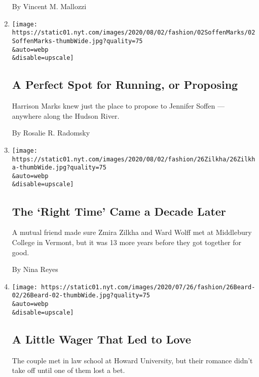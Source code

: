\begin{enumerate}
  By Vincent M. Mallozzi
\item
  \href{/2020/07/31/fashion/weddings/a-perfect-spot-for-running-or-proposing.html}{}

  \texttt{[image: https://static01.nyt.com/images/2020/08/02/fashion/02SoffenMarks/02SoffenMarks-thumbWide.jpg?quality=75\\\&auto=webp\\\&disable=upscale]}

  \hypertarget{a-perfect-spot-for-running-or-proposing}{%
  \subsection{A Perfect Spot for Running, or
  Proposing}\label{a-perfect-spot-for-running-or-proposing}}

  Harrison Marks knew just the place to propose to Jennifer Soffen ---
  anywhere along the Hudson River.

  By Rosalie R. Radomsky
\item
  \href{/2020/07/31/fashion/weddings/the-right-time-came-a-decade-later.html}{}

  \texttt{[image: https://static01.nyt.com/images/2020/08/02/fashion/26Zilkha/26Zilkha-thumbWide.jpg?quality=75\\\&auto=webp\\\&disable=upscale]}

  \hypertarget{the-right-time-came-a-decade-later}{%
  \subsection{The `Right Time' Came a Decade
  Later}\label{the-right-time-came-a-decade-later}}

  A mutual friend made sure Zmira Zilkha and Ward Wolff met at
  Middlebury College in Vermont, but it was 13 more years before they
  got together for good.

  By Nina Reyes
\item
  \href{/2020/07/24/fashion/weddings/a-little-wager-that-led-to-love.html}{}

  \texttt{[image: https://static01.nyt.com/images/2020/07/26/fashion/26Beard-02/26Beard-02-thumbWide.jpg?quality=75\\\&auto=webp\\\&disable=upscale]}

  \hypertarget{a-little-wager-that-led-to-love}{%
  \subsection{A Little Wager That Led to
  Love}\label{a-little-wager-that-led-to-love}}

  The couple met in law school at Howard University, but their romance
  didn't take off until one of them lost a bet.


\end{enumerate}
